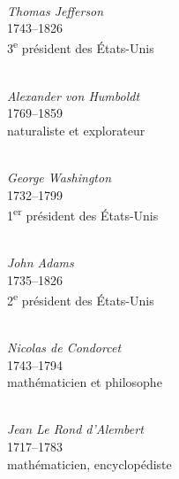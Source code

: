 \vspace*{\fill}
\begin{center}

  \begin{minipage}[b]{0.31\textwidth}
    \centering
    \\[0.3em]
    {\small\itshape Thomas Jefferson}\\
    {\footnotesize 1743--1826 \\ 3\textsuperscript{e} président des États-Unis}
  \end{minipage}
  \hfill
  \begin{minipage}[b]{0.31\textwidth}
    \centering
    \\[0.3em]
    {\small\itshape Alexander von Humboldt}\\
    {\footnotesize 1769--1859 \\ naturaliste et explorateur}
  \end{minipage}
  \hfill
  \begin{minipage}[b]{0.31\textwidth}
    \centering
    \\[0.3em]
    {\small\itshape George Washington}\\
    {\footnotesize 1732--1799 \\ 1\textsuperscript{er} président des États-Unis}
  \end{minipage}

  \vspace{1em}

  \begin{minipage}[b]{0.31\textwidth}
    \centering
    \\[0.3em]
    {\small\itshape John Adams}\\
    {\footnotesize 1735--1826 \\ 2\textsuperscript{e} président des États-Unis}
  \end{minipage}
  \hfill
  \begin{minipage}[b]{0.31\textwidth}
    \centering
    \\[0.3em]
    {\small\itshape Nicolas de Condorcet}\\
    {\footnotesize 1743--1794 \\ mathématicien et philosophe}
  \end{minipage}
  \hfill
  \begin{minipage}[b]{0.31\textwidth}
    \centering
    \\[0.3em]
    {\small\itshape Jean Le Rond d'Alembert}\\
    {\footnotesize 1717--1783 \\ mathématicien, encyclopédiste}
  \end{minipage}


\end{center}
